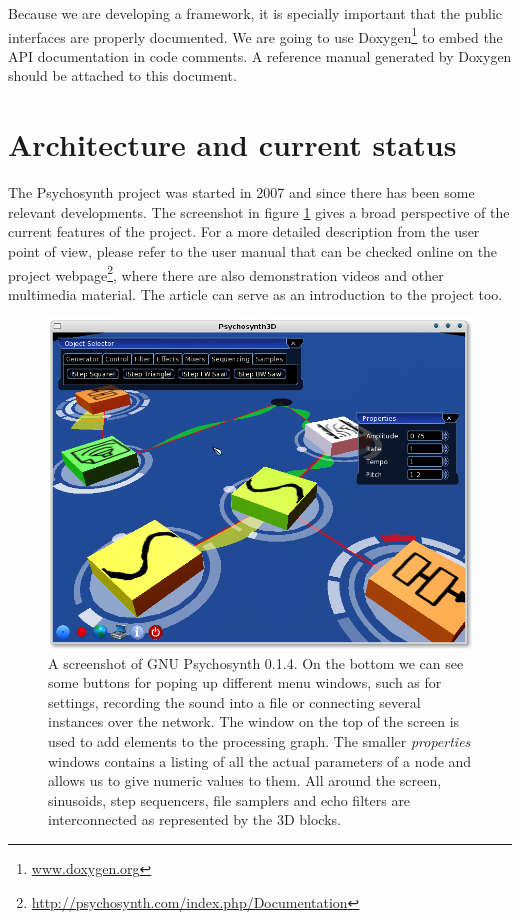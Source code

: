 Because we are developing a framework, it is specially important that
the public interfaces are properly documented. We are going to use
Doxygen\footnote{\url{www.doxygen.org}} to embed the API documentation
in code comments. A reference manual generated by Doxygen should be
attached to this document.

\section{Architecture and current status}

The Psychosynth project was started in 2007 and since there has been
some relevant developments. The screenshot in figure
\ref{fig:screenie} gives a broad perspective of the current features
of the project. For a more detailed description from the user point of
view, please refer to the user manual that can be checked online on
the project
webpage\footnote{\url{http://psychosynth.com/index.php/Documentation}},
where there are also demonstration videos and other multimedia
material. The article \cite{bolivar08psychosynth} can serve as an
introduction to the project too.

\begin{figure}[h!]
  \centering
  \includegraphics[width=.7\textwidth]{pic/screenie.png}
  \caption[A screenshot of GNU Psychosynth 0.1.4]{A screenshot of GNU
    Psychosynth 0.1.4. On the bottom we can see some buttons for
    poping up different menu windows, such as for settings, recording
    the sound into a file or connecting several instances over the
    network. The window on the top of the screen is used to add
    elements to the processing graph. The smaller \emph{properties}
    windows contains a listing of all the actual parameters of a node
    and allows us to give numeric values to them. All around the
    screen, sinusoids, step sequencers, file samplers and echo filters
    are interconnected as represented by the 3D blocks.}
  \label{fig:screenie}
\end{figure}

